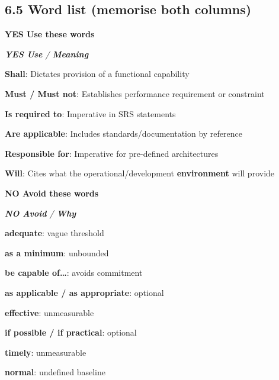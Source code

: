 \begin{studycolumns}
\vspace{0pt}

\subsection*{6.5 Word list (memorise both columns)}
\textbf{YES Use these words}


\begin{referenceentries}
\textit{\textbf{YES Use} / \textbf{Meaning}}\par\smallskip
\noindent \textbf{\textbf{Shall}}: Dictates provision of a functional capability\par
\noindent \textbf{\textbf{Must /\allowbreak{} Must not}}: Establishes performance requirement or constraint\par
\noindent \textbf{\textbf{Is required to}}: Imperative in SRS statements\par
\noindent \textbf{\textbf{Are applicable}}: Includes standards/\allowbreak{}documentation by reference\par
\noindent \textbf{\textbf{Responsible for}}: Imperative for pre-defined architectures\par
\noindent \textbf{\textbf{Will}}: Cites what the operational/\allowbreak{}development \textbf{environment} will provide\par
\end{referenceentries}
\textbf{NO Avoid these words}


\begin{referenceentries}
\textit{\textbf{NO Avoid} / \textbf{Why}}\par\smallskip
\noindent \textbf{adequate}: vague threshold\par
\noindent \textbf{as a minimum}: unbounded\par
\noindent \textbf{be capable of\ldots{}}: avoids commitment\par
\noindent \textbf{as applicable /\allowbreak{} as appropriate}: optional\par
\noindent \textbf{effective}: unmeasurable\par
\noindent \textbf{if possible /\allowbreak{} if practical}: optional\par
\noindent \textbf{timely}: unmeasurable\par
\noindent \textbf{normal}: undefined baseline\par
\end{referenceentries}


\end{studycolumns}
